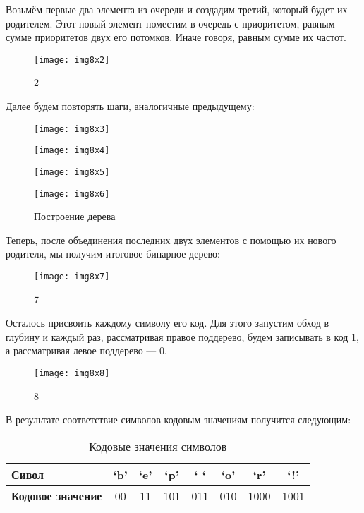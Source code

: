 Возьмём первые два элемента из очереди и создадим третий, который будет их
родителем. Этот новый элемент поместим в очередь с приоритетом, равным сумме
приоритетов двух его потомков. Иначе говоря, равным сумме их частот.

\begin{figure}[h]
  \centering
  \texttt{[image: img8x2]}
  \caption{2}\label{img:8x2}
\end{figure}
Далее будем повторять шаги, аналогичные предыдущему:

\begin{figure}[h]
  \centering
  \texttt{[image: img8x3]}
  \label{img:8x3}

  \texttt{[image: img8x4]}
  \label{img:8x4}

  \texttt{[image: img8x5]}
  \label{img:8x5}

  \texttt{[image: img8x6]}
  \caption{Построение дерева}\label{img:8x6}
\end{figure}

Теперь, после объединения последних двух элементов с помощью их нового
родителя, мы получим итоговое бинарное дерево:
\begin{figure}[h]
  \centering
  \texttt{[image: img8x7]}
  \caption{7}\label{img:8x7}
\end{figure}
Осталось присвоить каждому символу его код. Для этого запустим обход в
глубину и каждый раз, рассматривая правое поддерево, будем записывать в код
1, а рассматривая левое поддерево — 0.

\begin{figure}[h]
  \centering
  \texttt{[image: img8x8]}
  \caption{8}\label{img:8x8}
\end{figure}

В результате соответствие символов кодовым значениям получится следующим:
\begin{table} [htbp]%
  \centering
  \parbox{12cm}%
  {%
    \caption{Кодовые значения символов}%
    \label{tabl:tab8x2}%
    \begin{SingleSpace}
    \begin{tabular}{|l|c|c|c|c|c|c|c|}
    \hline
    \textbf{Сивол}            & ‘b’ & ‘e’ & ‘p’ & ‘ ‘ & ‘o’ & ‘r’  & ‘!’  \\ \hline
    \rowcolor[HTML]{EFEFEF}
    \textbf{Кодовое значение} & 00  & 11  & 101 & 011 & 010 & 1000 & 1001 \\ \hline
    \end{tabular}
    \end{SingleSpace}
    }
\end{table}

